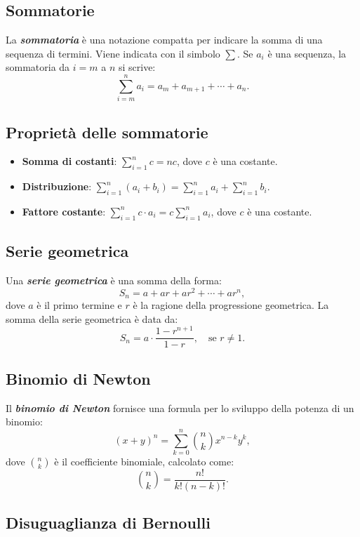 \documentclass[a4paper,12pt]{article}
\begin{document}
\subsection{Sommatorie}

La \textbf{\emph{sommatoria}} è una notazione compatta per indicare la somma di una sequenza di termini. Viene indicata con il simbolo \( \sum \). Se \( a_i \) è una sequenza, la sommatoria da \( i = m \) a \( n \) si scrive:
\[
	\sum_{i=m}^{n} a_i = a_m + a_{m+1} + \cdots + a_n.
\]

\subsection{Proprietà delle sommatorie}

\begin{itemize}
	\item \textbf{Somma di costanti}: \( \sum_{i=1}^{n} c = nc \), dove \( c \) è una costante.
	\item \textbf{Distribuzione}: \( \sum_{i=1}^{n} (a_i + b_i) = \sum_{i=1}^{n} a_i + \sum_{i=1}^{n} b_i \).
	\item \textbf{Fattore costante}: \( \sum_{i=1}^{n} c \cdot a_i = c \sum_{i=1}^{n} a_i \), dove \( c \) è una costante.
\end{itemize}

\subsection{Serie geometrica}

Una \textbf{\emph{serie geometrica}} è una somma della forma:
\[
	S_n = a + ar + ar^2 + \cdots + ar^{n},
\]
dove \( a \) è il primo termine e \( r \) è la ragione della progressione geometrica. La somma della serie geometrica è data da:
\[
	S_n = a \cdot \frac{1 - r^{n+1}}{1 - r}, \quad \text{se } r \neq 1.
\]

\subsection{Binomio di Newton}

Il \textbf{\emph{binomio di Newton}} fornisce una formula per lo sviluppo della potenza di un binomio:
\[
	(x + y)^n = \sum_{k=0}^{n} \binom{n}{k} x^{n-k} y^k,
\]
dove \( \binom{n}{k} \) è il coefficiente binomiale, calcolato come:
\[
	\binom{n}{k} = \frac{n!}{k!(n-k)!}.
\]

\subsection{Disuguaglianza di Bernoulli}
\end{document}

